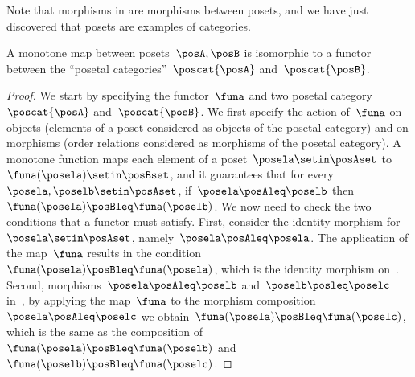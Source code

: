 
Note that morphisms in \Pos are morphisms between posets, and we have just discovered that posets are examples of categories.
\begin{lemma}
    \label{lem:posetfunctor}
    A monotone map between posets~$\posA,\posB$ is isomorphic to a functor between the ``posetal categories''~$\poscat{\posA}$ and~$\poscat{\posB}$.
\end{lemma}
\begin{proof}
    We start by specifying the functor~$\funa$ and two posetal category~$\poscat{\posA}$ and~$\poscat{\posB}$.
    We first specify the action of~$\funa$ on objects (elements of a poset considered as objects of the posetal category) and on morphisms (order relations considered as morphisms of the posetal category).
    A monotone function maps each element of a poset~$\posela\setin \posAset$ to~$\funa(\posela) \setin \posBset$, and it guarantees that for every~$\posela,\poselb\setin \posAset$, if~$\posela\posAleq \poselb$ then~$\funa(\posela)\posBleq \funa(\poselb)$.
    We now need to check the two conditions that a functor must satisfy.
    First, consider the identity morphism for~$\posela\setin \posAset$, namely~$\posela \posAleq \posela$.
    The application of the map~$\funa$ results in the condition~$\funa(\posela)\posBleq \funa(\posela)$, which is the identity morphism on~\posB.
    Second, morphisms~$\posela\posAleq \poselb$ and~$\poselb\posleq \poselc$ in~\posA, by applying the map~$\funa$ to the morphism composition~$\posela\posAleq \poselc$ we obtain~$\funa(\posela)\posBleq \funa(\poselc)$, which is the same as the composition of~$\funa(\posela)\posBleq \funa(\poselb)$ and~$\funa(\poselb)\posBleq \funa(\poselc)$.
\end{proof}

